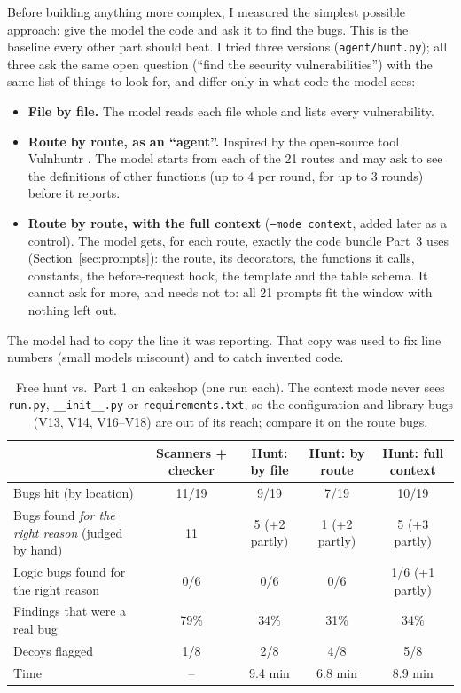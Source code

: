 \documentclass[11pt,a4paper]{article}
\newcommand{\code}[1]{\texttt{#1}}
\begin{document}
Before building anything more complex, I measured the simplest possible approach: give the model the code
and ask it to find the bugs. This is the baseline every other part should beat. I tried three versions
(\code{agent/hunt.py}); all three ask the same open question (``find the security vulnerabilities'') with the
same list of things to look for, and differ only in what code the model sees:

\begin{itemize}
  \item \textbf{File by file.} The model reads each file whole and lists every vulnerability.
  \item \textbf{Route by route, as an ``agent''.} Inspired by the open-source tool Vulnhuntr \cite{vulnhuntr}. The model
        starts from each of the 21 routes and may ask to see the definitions of other functions (up to 4 per
        round, for up to 3 rounds) before it reports.
  \item \textbf{Route by route, with the full context} (\code{--mode context}, added later as a control). The
        model gets, for each route, exactly the code bundle Part~3 uses (Section~\ref{sec:prompts}): the route,
        its decorators, the functions it calls, constants, the before-request hook, the template and the table
        schema. It cannot ask for more, and needs not to: all 21 prompts fit the window with nothing left out.
\end{itemize}

The model had to copy the line it was reporting. That copy was used to fix line numbers (small models
miscount) and to catch invented code.

\begin{table}[H]
\centering
\caption{Free hunt vs.\ Part 1 on cakeshop (one run each). The context mode never sees \code{run.py},
\code{\_\_init\_\_.py} or \code{requirements.txt}, so the configuration and library bugs (V13, V14, V16--V18) are
out of its reach; compare it on the route bugs.}
\small
\begin{tabularx}{\linewidth}{@{}Y c c c c@{}}
\toprule
 & \textbf{Scanners + checker} & \textbf{Hunt: by file} & \textbf{Hunt: by route} & \textbf{Hunt: full context} \\
\midrule
Bugs hit (by location) & 11/19 & 9/19 & 7/19 & 10/19 \\
Bugs found \emph{for the right reason} (judged by hand) & 11 & 5 (+2 partly) & 1 (+2 partly) & 5 (+3 partly) \\
Logic bugs found for the right reason & 0/6 & 0/6 & 0/6 & 1/6 (+1 partly) \\
Findings that were a real bug & 79\% & 34\% & 31\% & 34\% \\
Decoys flagged & 1/8 & 2/8 & 4/8 & 5/8 \\
Time & -- & 9.4 min & 6.8 min & 8.9 min \\
\bottomrule
\end{tabularx}
\end{table}
\end{document}
